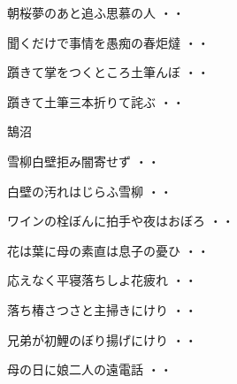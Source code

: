 \begin{shiika}朝桜夢のあと追ふ思慕の人
\hfill{・・}\end{shiika}
\vspace{0.6cm}
\begin{shiika}聞くだけで事情を愚痴の春炬燵
\hfill{・・}\end{shiika}
\begin{shiika}躓きて掌をつくところ土筆んぼ
\hfill{・・}\end{shiika}
\begin{shiika}躓きて土筆三本折りて詫ぶ
\hfill{・・}\end{shiika}
\vspace{0.6cm}
鵠沼
\begin{shiika}雪柳白壁拒み闇寄せず
\hfill{・・}\end{shiika}
\vspace{0.6cm}
\begin{shiika}白壁の汚れはじらふ雪柳
\hfill{・・}\end{shiika}
\vspace{0.6cm}
\begin{shiika}ワインの栓ぼんに拍手や夜はおぼろ
\hfill{・・}\end{shiika}
\vspace{0.6cm}
\begin{shiika}花は葉に母の素直は息子の憂ひ
\hfill{・・}\end{shiika}
\vspace{0.6cm}
\begin{shiika}応えなく平寝落ちしよ花疲れ
\hfill{・・}\end{shiika}
\vspace{0.6cm}
\begin{shiika}落ち椿さつさと主掃きにけり
\hfill{・・}\end{shiika}
\vspace{0.6cm}
\begin{shiika}兄弟が初鯉のぼり揚げにけり
\hfill{・・}\end{shiika}
\vspace{0.6cm}
\begin{shiika}母の日に娘二人の遠電話
\hfill{・・}\end{shiika}
